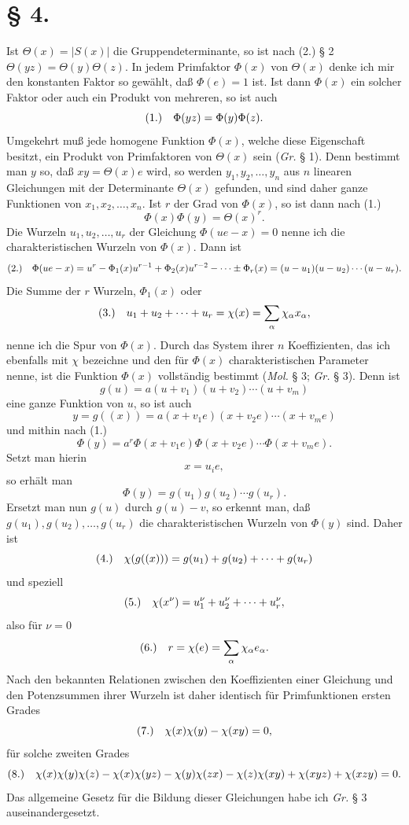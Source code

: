 \documentclass[11pt]{article}
\newcommand{\fnum}[1]{\textup{(\ensuremath{#1}.)}\quad}
\begin{document}
\section*{§ 4.}

Ist $\Theta(x)=|S(x)|$ die Gruppendeterminante, so ist nach (2.) § 2 $\Theta(yz)=\Theta(y)\Theta(z)$. In jedem Primfaktor $\Phi(x)$ von $\Theta(x)$ denke ich mir den konstanten Faktor so gewählt, daß $\Phi(e)=1$ ist. Ist dann $\Phi(x)$ ein solcher Faktor oder auch ein Produkt von mehreren, so ist auch
\[
\fnum{1} \Phi(yz)=\Phi(y)\Phi(z).
\]
Umgekehrt muß jede homogene Funktion $\Phi(x)$, welche diese Eigenschaft besitzt, ein Produkt von Primfaktoren von $\Theta(x)$ sein (\emph{Gr.} § 1). Denn bestimmt man $y$ so, daß $xy=\Theta(x)e$ wird, so werden $y_1,y_2,\ldots,y_n$ aus $n$ linearen Gleichungen mit der Determinante $\Theta(x)$ gefunden, und sind daher ganze Funktionen von $x_1,x_2,\ldots,x_n$. Ist $r$ der Grad von $\Phi(x)$, so ist dann nach (1.)
\[
 \Phi(x)\Phi(y)=\Theta(x)^r.
\]
Die Wurzeln $u_1,u_2,\ldots,u_r$ der Gleichung $\Phi(ue-x)=0$ nenne ich die charakteristischen Wurzeln von $\Phi(x)$. Dann ist
\[
\fnum{2} \Phi(ue-x)=u^r-\Phi_1(x)u^{r-1}+\Phi_2(x)u^{r-2}-\cdots\pm\Phi_r(x)
=(u-u_1)(u-u_2)\cdots(u-u_r).
\]
Die Summe der $r$ Wurzeln, $\Phi_1(x)$ oder
\[
\fnum{3} u_1+u_2+\cdots+u_r=\chi(x)=\sum_\alpha\chi_\alpha x_\alpha,
\]
nenne ich die Spur von $\Phi(x)$. Durch das System ihrer $n$ Koeffizienten, das ich ebenfalls mit $\chi$ bezeichne und den für $\Phi(x)$ charakteristischen Parameter nenne, ist die Funktion $\Phi(x)$ vollständig bestimmt (\emph{Mol.} § 3; \emph{Gr.} § 3). Denn ist
\[
 g(u)=a(u+v_1)(u+v_2)\cdots(u+v_m)
\]
eine ganze Funktion von $u$, so ist auch
\[
 y=g((x))=a(x+v_1e)(x+v_2e)\cdots(x+v_me)
\]
und mithin nach (1.)
\[
 \Phi(y)=a^r\Phi(x+v_1e)\Phi(x+v_2e)\cdots\Phi(x+v_me).
\]
Setzt man hierin
\[
 x=u_ie,
\]
so erhält man
\[
 \Phi(y)=g(u_1)g(u_2)\cdots g(u_r).
\]
Ersetzt man nun $g(u)$ durch $g(u)-v$, so erkennt man, daß $g(u_1),g(u_2),\ldots,g(u_r)$ die charakteristischen Wurzeln von $\Phi(y)$ sind. Daher ist
\[
\fnum{4} \chi(g((x)))=g(u_1)+g(u_2)+\cdots+g(u_r)
\]
und speziell
\[
\fnum{5} \chi(x^\nu)=u_1^\nu+u_2^\nu+\cdots+u_r^\nu,
\]
also für $\nu=0$
\[
\fnum{6} r=\chi(e)=\sum_\alpha\chi_\alpha e_\alpha.
\]
Nach den bekannten Relationen zwischen den Koeffizienten einer Gleichung und den Potenzsummen ihrer Wurzeln ist daher identisch für Primfunktionen ersten Grades
\[
\fnum{7} \chi(x)\chi(y)-\chi(xy)=0,
\]
für solche zweiten Grades
\[
\fnum{8} \chi(x)\chi(y)\chi(z)-\chi(x)\chi(yz)-\chi(y)\chi(zx)-\chi(z)\chi(xy)+\chi(xyz)+\chi(xzy)=0.
\]
Das allgemeine Gesetz für die Bildung dieser Gleichungen habe ich \emph{Gr.} § 3 auseinandergesetzt.
\end{document}

